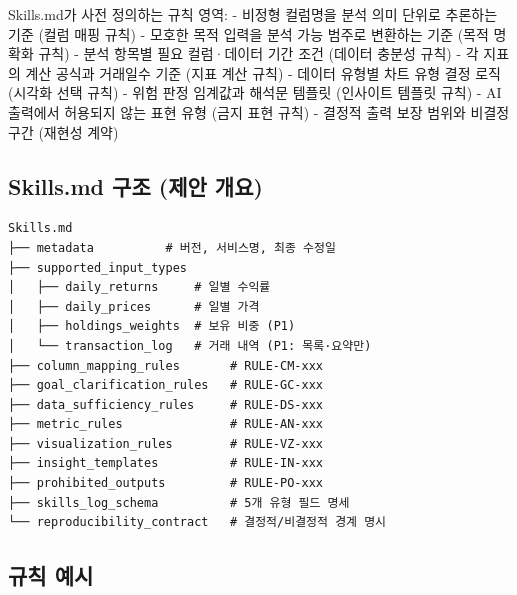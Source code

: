 \documentclass[10pt,a4paper]{article}
\begin{document}
Skills.md가 사전 정의하는 규칙 영역:
- 비정형 컬럼명을 분석 의미 단위로 추론하는 기준 (컬럼 매핑 규칙)
- 모호한 목적 입력을 분석 가능 범주로 변환하는 기준 (목적 명확화 규칙)
- 분석 항목별 필요 컬럼·데이터 기간 조건 (데이터 충분성 규칙)
- 각 지표의 계산 공식과 거래일수 기준 (지표 계산 규칙)
- 데이터 유형별 차트 유형 결정 로직 (시각화 선택 규칙)
- 위험 판정 임계값과 해석문 템플릿 (인사이트 템플릿 규칙)
- AI 출력에서 허용되지 않는 표현 유형 (금지 표현 규칙)
- 결정적 출력 보장 범위와 비결정 구간 (재현성 계약)

\subsection{Skills.md 구조 (제안 개요)}\label{skills.md-uxad6cuxc870-uxc81cuxc548-uxac1cuxc694}

\begin{verbatim}
Skills.md
├── metadata          # 버전, 서비스명, 최종 수정일
├── supported_input_types
│   ├── daily_returns     # 일별 수익률
│   ├── daily_prices      # 일별 가격
│   ├── holdings_weights  # 보유 비중 (P1)
│   └── transaction_log   # 거래 내역 (P1: 목록·요약만)
├── column_mapping_rules       # RULE-CM-xxx
├── goal_clarification_rules   # RULE-GC-xxx
├── data_sufficiency_rules     # RULE-DS-xxx
├── metric_rules               # RULE-AN-xxx
├── visualization_rules        # RULE-VZ-xxx
├── insight_templates          # RULE-IN-xxx
├── prohibited_outputs         # RULE-PO-xxx
├── skills_log_schema          # 5개 유형 필드 명세
└── reproducibility_contract   # 결정적/비결정적 경계 명시
\end{verbatim}


\subsection{규칙 예시}\label{규칙-예시}
\end{document}
